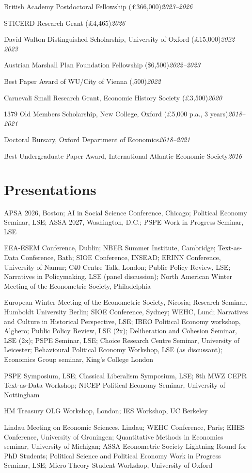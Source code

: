 \documentclass[10pt,a4paper]{article}
\newcommand{\pentry}[2]{#1\hfill\textit{#2}\par}
\newcommand{\presyear}[2]{\par\noindent\hangindent=2.1cm\hangafter=1 \makebox[2.1cm][l]{\textbf{#1}}#2\par}
\begin{document}
\pentry{British Academy Postdoctoral Fellowship (\pounds 366,000)}{2023--2026}
\pentry{STICERD Research Grant (\pounds 4,465)}{2026}
\pentry{David Walton Distinguished Scholarship, University of Oxford (\pounds 15,000)}{2022--2023}
\pentry{Austrian Marshall Plan Foundation Fellowship (\$6,500)}{2022--2023}
\pentry{Best Paper Award of WU/City of Vienna (,500)}{2022}
\pentry{Carnevali Small Research Grant, Economic History Society (\pounds 3,500)}{2020}
\pentry{1379 Old Members Scholarship, New College, Oxford (\pounds 5,000 p.a., 3 years)}{2018--2021}
\pentry{Doctoral Bursary, Oxford Department of Economics}{2018--2021}
\pentry{Best Undergraduate Paper Award, International Atlantic Economic Society}{2016}

\section{Presentations}

\presyear{Upcoming}{APSA 2026, Boston; AI in Social Science Conference, Chicago; Political Economy Seminar, LSE; ASSA 2027, Washington, D.C.; PSPE Work in Progress Seminar, LSE}

\presyear{2026}{EEA-ESEM Conference, Dublin; NBER Summer Institute, Cambridge; Text-as-Data Conference, Bath; SIOE Conference, INSEAD; ERINN Conference, University of Namur; C40 Centre Talk, London; Public Policy Review, LSE; Narratives in Policymaking, LSE (panel discussion); North American Winter Meeting of the Econometric Society, Philadelphia}

\presyear{2025}{European Winter Meeting of the Econometric Society, Nicosia; Research Seminar, Humboldt University Berlin; SIOE Conference, Sydney; WEHC, Lund; Narratives and Culture in Historical Perspective, LSE; IBEO Political Economy workshop, Alghero; Public Policy Review, LSE (2x); Deliberation and Cohesion Seminar, LSE (2x); PSPE Seminar, LSE; Choice Research Centre Seminar, University of Leicester; Behavioural Political Economy Workshop, LSE (as discussant); Economics Group seminar, King's College London}

\presyear{2024}{PSPE Symposium, LSE; Classical Liberalism Symposium, LSE; 8th MWZ CEPR Text-as-Data Workshop; NICEP Political Economy Seminar, University of Nottingham}

\presyear{2023}{HM Treasury OLG Workshop, London; IES Workshop, UC Berkeley}

\presyear{2022}{Lindau Meeting on Economic Sciences, Lindau; WEHC Conference, Paris; EHES Conference, University of Groningen; Quantitative Methods in Economics seminar, University of Michigan; ASSA Econometric Society Lightning Round for PhD Students; Political Science and Political Economy Work in Progress Seminar, LSE; Micro Theory Student Workshop, University of Oxford}
\end{document}
